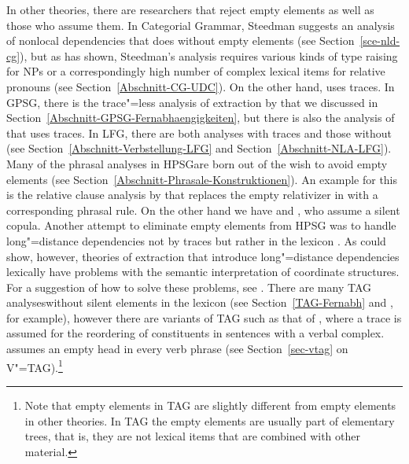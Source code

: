 In other theories, there are researchers that reject empty elements as well as those who assume them.
In Categorial Grammar\indexcg, Steedman suggests an analysis of nonlocal dependencies that does
without empty elements (see Section~\ref{sce-nld-cg}), but as \citet{Pollard88a} has shown,
Steedman's analysis requires various kinds of type raising
for NPs or a correspondingly high number of complex lexical items for relative pronouns (see Section~\ref{Abschnitt-CG-UDC}). On the other hand,
\citet{Koenig99a-u} uses
traces. In GPSG\indexgpsg, there is the trace"=less analysis of extraction by \citet[--77]{Uszkoreit87a} that we discussed in 
Section~\ref{Abschnitt-GPSG-Fernabhaengigkeiten}, but there is also the analysis of \citet*[]{GKPS85a} that uses traces. In LFG\indexlfg, there are both analyses with
traces \citep[]{Bresnan2001a} and those without (see Section~\ref{Abschnitt-Verbstellung-LFG} and Section~\ref{Abschnitt-NLA-LFG}). 
Many of the phrasal analyses in HPSG\indexhpsg are born out of the wish to avoid empty elements (see Section~\ref{Abschnitt-Phrasale-Konstruktionen}). 
An example for this is the relative clause analysis by \citet{Sag97a} that replaces the empty
relativizer in  with a corresponding phrasal rule. On the other hand we have
 and , who assume a silent copula. Another attempt to eliminate empty elements from HPSG was to handle
long"=distance dependencies not by traces but rather in the lexicon \citep*{BMS2001a}. As \citet{LH2006a} could show, however, theories of extraction that
introduce long"=distance dependencies lexically have problems with the semantic interpretation of coordinate structures. For a suggestion of how to solve these problems,
see . There are many TAG analyses\indextag without silent elements in the lexicon (see Section~\ref{TAG-Fernabh} and , for example),
however there are variants of TAG such as that of \citet[]{Kallmeyer2005a-u}, where a trace is assumed for the reordering of constituents in sentences with
a verbal complex. \citet[--11]{Rambow94a} assumes an empty head in every verb
phrase (see Section~\ref{sec-vtag} on V"=TAG).\footnote{
  Note that empty elements in TAG are slightly different from empty elements in other theories. In
  TAG the empty elements are usually part of elementary trees, that is, they are not lexical items that are
  combined with other material.
}
